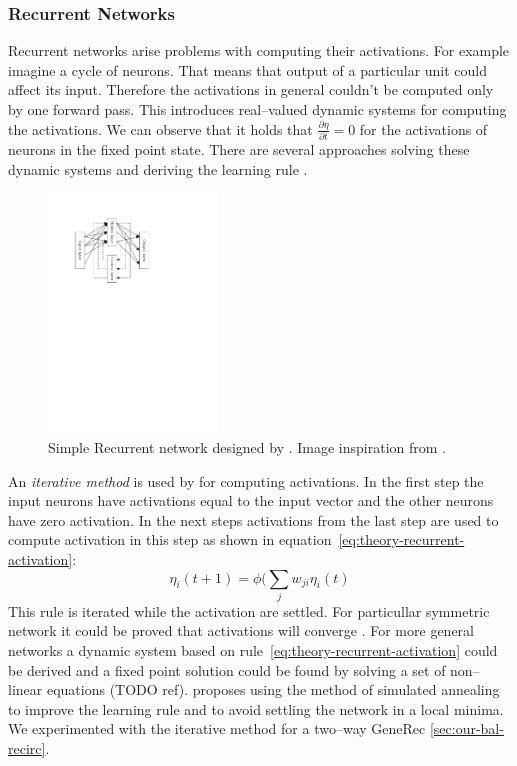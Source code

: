 \subsubsection{Recurrent Networks}
\label{sec:theory-recurrent} 

Recurrent networks arise problems with computing their activations. For example imagine a cycle of neurons. That means that output of a particular unit could affect its input. Therefore the activations in general couldn't be computed only by one forward pass. This introduces real--valued dynamic systems for computing the activations. We can observe that it holds that $\frac{\partial\eta}{\partial t} = 0$ for the activations of neurons in the fixed point state. There are several approaches solving these dynamic systems and deriving the learning rule \cite{pineda1987generalization, pearlmutter1989learning, williams1989learning, elman1990finding, haykin1994neural}. 

\begin{figure}[H]
  \centering
  \includegraphics[width=0.4\textwidth]{img/models-recurrent.pdf}    
  \caption{Simple Recurrent network designed by \citet{elman1990finding}. Image inspiration from \citet{haykin1994neural}.} 
  \label{fig:theory-recurrent}
\end{figure}

An \emph{iterative method} is used by \citet{movellan1990contrastive} for computing activations. In the first step the input neurons have activations equal to the input vector and the other neurons have zero activation. In the next steps activations from the last step are used to compute activation in this step as shown in equation~\ref{eq:theory-recurrent-activation}: 
\begin{equation}
  \label{eq:theory-recurrent-activation} 
  \eta_i(t+1) = \phi(\sum_j w_{ji}\eta_i(t)
\end{equation}
This rule is iterated while the activation are settled. For particullar symmetric network it could be proved that activations will converge \citep{o1996bio}. For more general networks a dynamic system based on rule~\ref{eq:theory-recurrent-activation} could be derived and a fixed point solution could be found by solving a set of non--linear equations (TODO ref). \citet{movellan1990contrastive} proposes using the method of simulated annealing \citep{kirkpatrick1983optimization,vcerny1985thermodynamical} to improve the learning rule and to avoid settling the network in a local minima. We experimented with the iterative method for a two--way GeneRec \ref{sec:our-bal-recirc}. 


